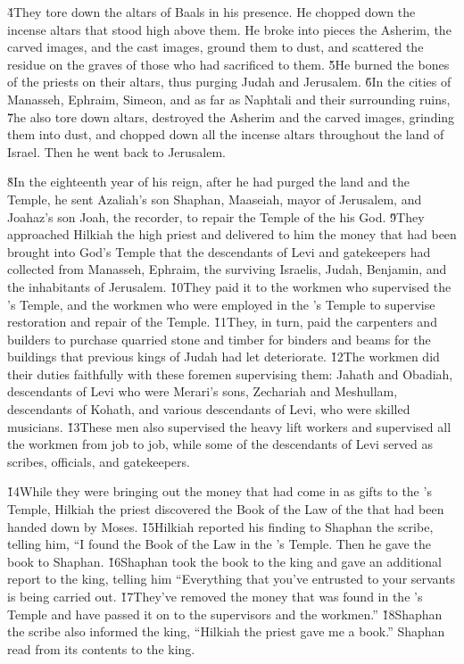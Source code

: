 \v{4}They tore down the altars of Baals in his presence. He chopped down the incense altars that stood high above them. He broke into pieces the Asherim, the carved images, and the cast images, ground them to dust, and scattered the residue on the graves of those who had sacrificed to them. \v{5}He burned the bones of the priests on their altars, thus purging Judah and Jerusalem. \v{6}In the cities of Manasseh, Ephraim, Simeon, and as far as Naphtali and their surrounding ruins, \v{7}he also tore down altars, destroyed the Asherim and the carved images, grinding them into dust, and chopped down all the incense altars throughout the land of Israel. Then he went back to Jerusalem.

\v{8}In the eighteenth year of his reign, after he had purged the land and the Temple, he sent Azaliah's son Shaphan, Maaseiah, mayor of Jerusalem, and Joahaz's son Joah, the recorder, to repair the Temple of the  his God. \v{9}They approached Hilkiah the high priest and delivered to him the money that had been brought into God's Temple that the descendants of Levi and gatekeepers had collected from Manasseh, Ephraim, the surviving Israelis, Judah, Benjamin, and the inhabitants of Jerusalem. \v{10}They paid it to the workmen who supervised the 's Temple, and the workmen who were employed in the 's Temple to supervise restoration and repair of the Temple. \v{11}They, in turn, paid the carpenters and builders to purchase quarried stone and timber for binders and beams for the buildings that previous kings of Judah had let deteriorate. \v{12}The workmen did their duties faithfully with these foremen supervising them: Jahath and Obadiah, descendants of Levi who were Merari's sons, Zechariah and Meshullam, descendants of Kohath, and various descendants of Levi, who were skilled musicians. \v{13}These men also supervised the heavy lift workers and supervised all the workmen from job to job, while some of the descendants of Levi served as scribes, officials, and gatekeepers.

\v{14}While they were bringing out the money that had come in as gifts to the 's Temple, Hilkiah the priest discovered the Book of the Law of the  that had been handed down by Moses. \v{15}Hilkiah reported his finding to Shaphan the scribe, telling him, ``I found the Book of the Law in the 's Temple. Then he gave the book to Shaphan. \v{16}Shaphan took the book to the king and gave an additional report to the king, telling him ``Everything that you've entrusted to your servants is being carried out. \v{17}They've removed the money that was found in the 's Temple and have passed it on to the supervisors and the workmen.'' \v{18}Shaphan the scribe also informed the king, ``Hilkiah the priest gave me a book.'' Shaphan read from its contents to the king.

